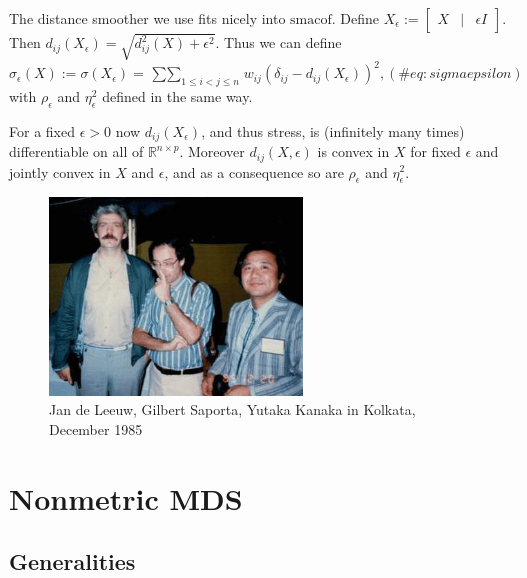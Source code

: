 \documentclass[
  12pt,
  letterpaper,
  DIV=11,
  numbers=noendperiod]{scrreprt}
\theoremstyle{remark}
\begin{document}
The distance smoother we use fits nicely into \(\textrm{smacof}\).
Define \(X_\epsilon:=\begin{bmatrix}X&\mid&\epsilon I\end{bmatrix}\).
Then \(d_{ij}(X_\epsilon)=\sqrt{d_{ij}^2(X)+\epsilon^2}\). Thus we can
define \begin{equation}
\sigma_\epsilon(X):=\sigma(X_\epsilon)=\mathop{\sum\sum}_{1\leq i<j\leq n}w_{ij}(\delta_{ij}- d_{ij}(X_\epsilon))^2,
(\#eq:sigmaepsilon)
\end{equation} with \(\rho_\epsilon\) and \(\eta^2_\epsilon\) defined in
the same way.

For a fixed \(\epsilon>0\) now \(d_{ij}(X_\epsilon)\), and thus stress,
is (infinitely many times) differentiable on all of
\(\mathbb{R}^{n\times p}\). Moreover \(d_{ij}(X,\epsilon)\) is convex in
\(X\) for fixed \(\epsilon\) and jointly convex in \(X\) and
\(\epsilon\), and as a consequence so are \(\rho_\epsilon\) and
\(\eta^2_\epsilon\).

\begin{figure}[H]

{\centering \includegraphics[width=0.6\textwidth,height=\textheight]{graphics/calcutta_12_85.png}

}

\caption{Jan de Leeuw, Gilbert Saporta, Yutaka Kanaka in Kolkata,
December 1985}

\end{figure}%


\chapter{Nonmetric MDS}\label{nonmtrmds}

\section{Generalities}\label{generalities}
\end{document}
